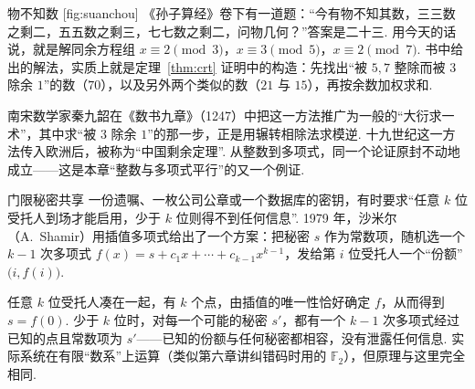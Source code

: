 \documentclass[lang=cn,10.5pt,scheme=chinese,toc=twocol,section,chinesefont=nofont,
twoside,citestyle=gb7714-2015,bibstyle=gb7714-2015]{elegantbook}
\numberwithin{equation}{section}   %
\begin{document}
\begin{historybox}{物不知数}
  [fig:suanchou]
  《孙子算经》卷下有一道题：“今有物不知其数，三三数之剩二，五五数之剩三，七七数之剩二，问物几何？”答案是二十三. 用今天的话说，就是解同余方程组 $x\equiv2\pmod3$，$x\equiv3\pmod5$，$x\equiv2\pmod7$. 书中给出的解法，实质上就是定理~\ref{thm:crt} 证明中的构造：先找出“被 $5,7$ 整除而被 $3$ 除余 $1$”的数（$70$），以及另外两个类似的数（$21$ 与 $15$），再按余数加权求和.

  南宋数学家秦九韶在《数书九章》（1247）中把这一方法推广为一般的“大衍求一术”，其中求“被 $3$ 除余 $1$”的那一步，正是用辗转相除法求模逆. 十九世纪这一方法传入欧洲后，被称为“中国剩余定理”. 从整数到多项式，同一个论证原封不动地成立——这是本章“整数与多项式平行”的又一个例证.
\end{historybox}

\begin{linkbox}{门限秘密共享}
  一份遗嘱、一枚公司公章或一个数据库的密钥，有时要求“任意 $k$ 位受托人到场才能启用，少于 $k$ 位则得不到任何信息”. 1979 年，沙米尔（A.~Shamir）用插值多项式给出了一个方案：把秘密 $s$ 作为常数项，随机选一个 $k-1$ 次多项式 $f(x)=s+c_1x+\cdots+c_{k-1}x^{k-1}$，发给第 $i$ 位受托人一个“份额” $\big(i,f(i)\big)$.

  任意 $k$ 位受托人凑在一起，有 $k$ 个点，由插值的唯一性恰好确定 $f$，从而得到 $s=f(0)$. 少于 $k$ 位时，对每一个可能的秘密 $s'$，都有一个 $k-1$ 次多项式经过已知的点且常数项为 $s'$——已知的份额与任何秘密都相容，没有泄露任何信息. 实际系统在有限“数系”上运算（类似第六章讲纠错码时用的 $\mathbb{F}_2$），但原理与这里完全相同.
\end{linkbox}
\end{document}
